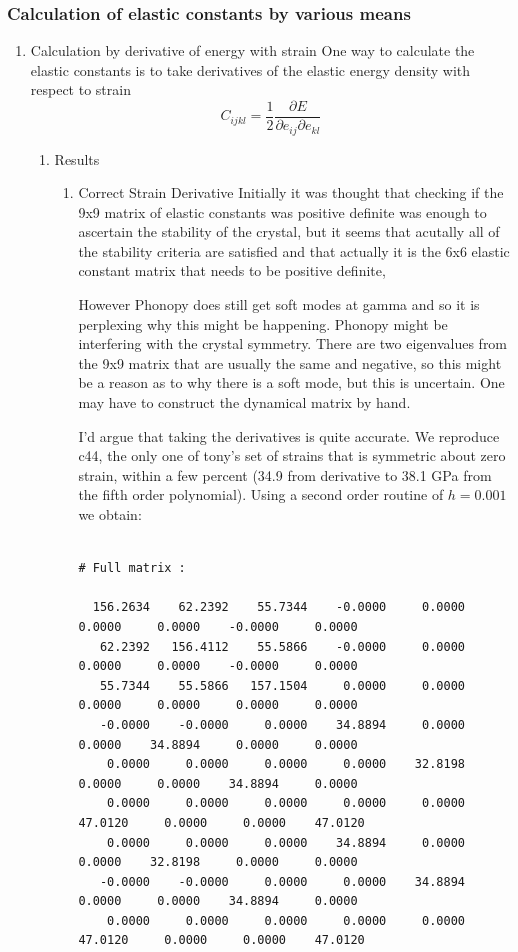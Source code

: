 \documentclass[11pt]{article}
\begin{document}
\subsubsection{Calculation of elastic constants by various means}
\label{sec:orgfdbece0}
\begin{enumerate}
\item Calculation by derivative of energy with strain
\label{sec:org0f637d7}
One way to calculate the elastic constants is to take derivatives of the elastic energy density with respect to strain
\[ C_{ijkl} = \frac{1}{2}\frac{\partial E}{ \partial e_{ij} \partial
e_{kl} } \]
\begin{enumerate}
\item Results
\label{sec:org157c864}
\begin{enumerate}
\item Correct Strain Derivative
\label{sec:org6232a7b}
Initially it was thought that checking if the 9x9 matrix of elastic constants was positive definite was enough
to ascertain the stability of the crystal, but it seems that acutally all of the stability criteria
are satisfied and that actually it is the 6x6 elastic constant matrix that needs to be positive definite,

However Phonopy does still get soft modes at gamma and so it is perplexing why this might be happening. 
Phonopy might be interfering with the crystal symmetry.
There are two eigenvalues from the 9x9 matrix that are usually the same and negative, so this might be a reason
as to why there is a soft mode, but this is uncertain. One may have to construct the dynamical matrix by hand. 

I'd argue that taking the derivatives is quite accurate. We reproduce c44, the only one of tony's set of strains
that is symmetric about zero strain, within a few percent (34.9 from derivative to 38.1 GPa from the fifth order polynomial).
Using a second order routine of \(h=0.001\) we obtain:
\begin{verbatim}

# Full matrix :

  156.2634    62.2392    55.7344    -0.0000     0.0000     0.0000     0.0000    -0.0000     0.0000
   62.2392   156.4112    55.5866    -0.0000     0.0000     0.0000     0.0000    -0.0000     0.0000
   55.7344    55.5866   157.1504     0.0000     0.0000     0.0000     0.0000     0.0000     0.0000
   -0.0000    -0.0000     0.0000    34.8894     0.0000     0.0000    34.8894     0.0000     0.0000
    0.0000     0.0000     0.0000     0.0000    32.8198     0.0000     0.0000    34.8894     0.0000
    0.0000     0.0000     0.0000     0.0000     0.0000    47.0120     0.0000     0.0000    47.0120
    0.0000     0.0000     0.0000    34.8894     0.0000     0.0000    32.8198     0.0000     0.0000
   -0.0000    -0.0000     0.0000     0.0000    34.8894     0.0000     0.0000    34.8894     0.0000
    0.0000     0.0000     0.0000     0.0000     0.0000    47.0120     0.0000     0.0000    47.0120


\end{verbatim}
\end{enumerate}
\end{enumerate}
\end{enumerate}
\end{document}
